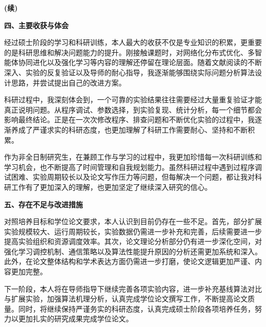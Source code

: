 \begin{titlepage}
    \makeatletter
    \makeatother
    \vspace{2.15cm}

\par
\textbf{(续)}
\par

\textbf{四、主要收获与体会}

\par
\indent
经过硕士阶段的学习和科研训练，本人最大的收获不仅是专业知识的积累，更重要的是科研思维和解决问题能力的提升。刚接触课题时，对网络化分布式优化、多智能体协同进化以及强化学习等内容的理解还停留在理论层面。随着文献阅读的不断深入、实验的反复验证以及导师的耐心指导，我逐渐能够围绕实际问题分析算法设计思路，并尝试提出自己的改进方案。

\par
\indent
科研过程中，我深刻体会到，一个可靠的实验结果往往需要经过大量重复验证才能真正说明问题。从程序调试、参数选择，到实验复现、统计分析，每一个细节都会影响最终结论。正是在一次次修改程序、排查问题和不断优化实验的过程中，我逐渐养成了严谨求实的科研态度，也更加理解了科研工作需要耐心、坚持和不断积累。

\par
\indent
作为非全日制研究生，在兼顾工作与学习的过程中，我更加珍惜每一次科研训练和学习机会，也不断提高了时间管理和自我规划能力。虽然科研过程中遇到过程序调试困难、实验周期较长以及论文写作压力等问题，但每解决一个问题，都让我对科研工作有了更加深入的理解，也更加坚定了继续深入研究的信心。

\noindent\textbf{五、存在不足与改进措施}

\par
\indent
对照培养目标和学位论文要求，本人认识到目前仍存在一些不足。首先，部分扩展实验规模较大、运行周期较长，实验数据仍需进一步补充和完善，后续需要进一步提高实验组织和资源调度效率。其次，论文理论分析部分仍有进一步深化空间，对强化学习调控机制、通信策略以及算法性能提升原因的分析还需更加系统和深入。此外，在论文整体结构和学术表达方面仍需进一步打磨，使论文逻辑更加严谨、内容更加完整。

\par
\indent
下一阶段，本人将在导师指导下继续完善各项实验内容，进一步补充基线算法对比与扩展实验，加强算法机理分析，认真完成学位论文撰写工作，不断提高论文质量。同时，将继续保持严谨务实的科研态度，认真完成硕士阶段各项培养任务，努力以更加扎实的研究成果完成学位论文。

\end{titlepage}

